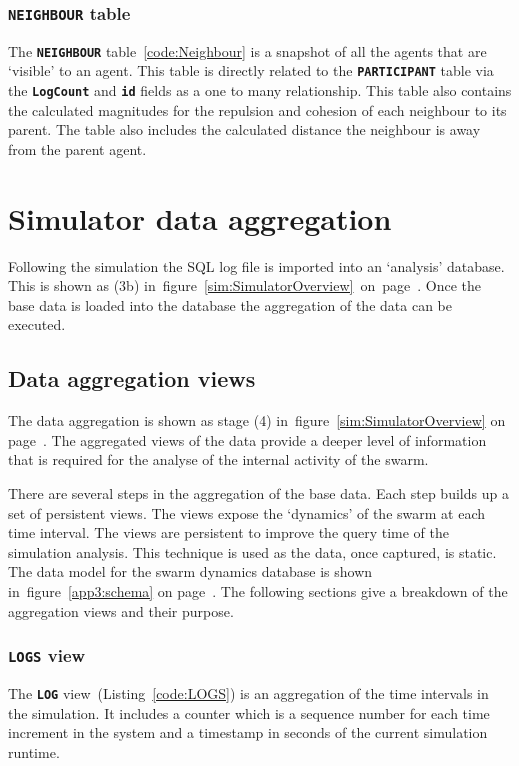 \subsubsection{\texttt{\textbf{NEIGHBOUR}} table} 
The \texttt{\textbf{NEIGHBOUR}} table~\ref{code:Neighbour} is a snapshot of all the agents that are `visible' to an agent. This table is directly related to the \texttt{\textbf{PARTICIPANT}} table via the \texttt{\textbf{LogCount}} and \texttt{\textbf{id}} fields as a one to many relationship. This table also contains the calculated magnitudes for the repulsion and cohesion of each neighbour to its parent. The table also includes the calculated distance the neighbour is away from the parent agent. 

\section{Simulator data aggregation}
Following the simulation the SQL log file is imported into an `analysis' database. This is shown as (3b) in~figure~\ref{sim:SimulatorOverview}~on~page~\pageref{sim:SimulatorOverview}. Once the base data is loaded into the database the aggregation of the data can be executed.

\subsection{Data aggregation views}
The data aggregation is shown as stage (4) in~figure~\ref{sim:SimulatorOverview} on page~\pageref{sim:SimulatorOverview}. The aggregated views of the data provide a deeper level of information that is required for the analyse of the internal activity of the swarm.

There are several steps in the aggregation of the base data. Each step builds up a set of persistent views. The views expose the `dynamics' of the swarm at each time interval. The views are persistent to improve the query time of the simulation analysis. This technique is used as the data, once captured, is static. The data model for the swarm dynamics database is shown in~figure~\ref{app3:schema} on page~\pageref{app3:schema}. The following sections give a breakdown of the aggregation views and their purpose.

\subsubsection{\texttt{\textbf{LOGS}} view}
The \texttt{\textbf{LOG}} view~(Listing~\ref{code:LOGS}) is an aggregation of the time intervals in the simulation. It includes a counter which is a sequence number for each time increment in the system and a timestamp in seconds of the current simulation runtime.


